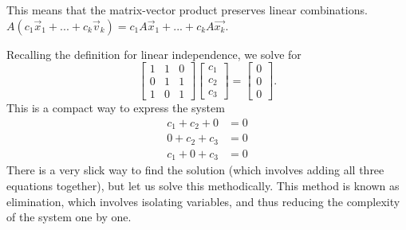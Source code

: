 This means that the matrix-vector product preserves linear combinations.
$A(c_1\vec{x}_1+...+c_k\vec{v}_k)=c_1A\vec{x}_1+...+c_kA\vec{x_k}$.

Recalling the definition for linear independence, we solve for 
\[
\begin{bmatrix}
	1&1&0\\
	0& 1 & 1\\
	1& 0 & 1
\end{bmatrix} \begin{bmatrix}
	c_1 \\ c_2\\c_3
\end{bmatrix} = \begin{bmatrix}
	0\\0\\0
\end{bmatrix}.
\]
This is a compact way to express the system
\begin{align*}
	c_1 + c_2 + 0 &= 0 \\
	 0+  c_2 +  c_3 &= 0\\
	c_1+ 0+c_3 &= 0
\end{align*}
There is a very slick way to find the solution (which involves adding all three equations together), but let us solve this methodically. This method is known as elimination, which involves isolating variables, and thus reducing the complexity of the system one by one.
